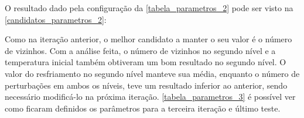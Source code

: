 \documentclass[
	12pt,				%
	openright,			%
	twoside,			%
	a4paper,			%
	english,			%
	french,				%
	spanish,			%
	brazil				%
	]{abntex2}
\begin{document}
O resultado dado pela configuração da \autoref{tabela_parametros_2} pode ser visto na \autoref{candidatos_parametros_2}:

\begin{table}[ht]
	\centering
	\caption{Candidatos a parâmetros na segunda iteração}
	\label{candidatos_parametros_2}
\end{table}

Como na iteração anterior, o melhor candidato a manter o seu valor é o número de vizinhos. Com a análise feita, o número de vizinhos no segundo nível e a temperatura inicial também obtiveram um bom resultado no segundo nível. O valor do resfriamento no segundo nível manteve sua média, enquanto o número de perturbações em ambos os níveis, teve um resultado inferior ao anterior, sendo necessário modificá-lo na próxima iteração. \autoref{tabela_parametros_3} é possível ver como ficaram definidos os parâmetros para a terceira iteração e último teste.
\end{document}
